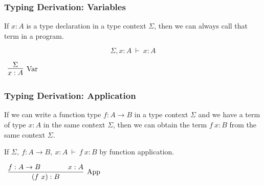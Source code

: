 \documentclass{beamer}
\theoremstyle{indentDefn} \newtheorem{defn}[]{Definition}
\begin{document}
\begin{frame}
  \frametitle{Typing Derivation: Variables}

  If $x : A$ is a type declaration in a type context $\Sigma$, then we can always call that term in a program. 

  $$\Sigma, x : A \ \vdash \ x : A$$

  \vspace{2cm}

  \begin{center}
    $\begin{array}{c}
        \infer[\text{Var}]{x : A}{\Sigma}
    \end{array}$
  \end{center}


\end{frame}

\begin{frame}
  \frametitle{Typing Derivation: Application}

  If we can write a function type $f: A \to B$ in a type context $\Sigma$ and we have a term of type $x : A$ in the same context $\Sigma$, then we can obtain the term $f \ x : B$ from the same context $\Sigma$. 

  If $\Sigma, \ f : A \to B, \ x : A \ \vdash \ f \ x : B$ by function application.

  \vspace{2cm}

  \begin{center}
    $\begin{array}{c}
        \infer[\text{App}]{(f \ x) : B}
          {f : A \to B \hspace{0.5cm} & \hspace{0.5cm} x : A}
    \end{array}$
  \end{center}

\end{frame}
\end{document}
